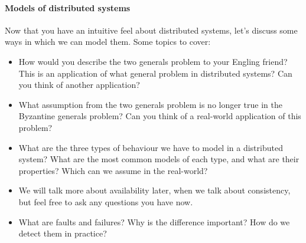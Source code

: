 \documentclass[12pt,a4paper,oneside,openright]{report}
\newcommand{\question}[2]{\paragraph{#1} #2}
\begin{document}
\question{Models of distributed systems}{Now that you have an
  intuitive feel about distributed systems, let's discuss some ways in
  which we can model them. Some topics to cover:
  \begin{itemize}
  \item How would you describe the two generals problem to your
    Engling friend? This is an application of what general problem in
    distributed systems? Can you think of another application?
  \item What assumption from the two generals problem is no longer
    true in the Byzantine generals problem? Can you think of a
    real-world application of this problem?
  \item What are the three types of behaviour we have to model in a
    distributed system? What are the most common models of each type,
    and what are their properties? Which can we assume in the
    real-world?
  \item We will talk more about availability later, when we talk about
    consistency, but feel free to ask any questions you have now.
  \item What are faults and failures? Why is the difference important?
    How do we detect them in practice?
  \end{itemize}
}
\end{document}
